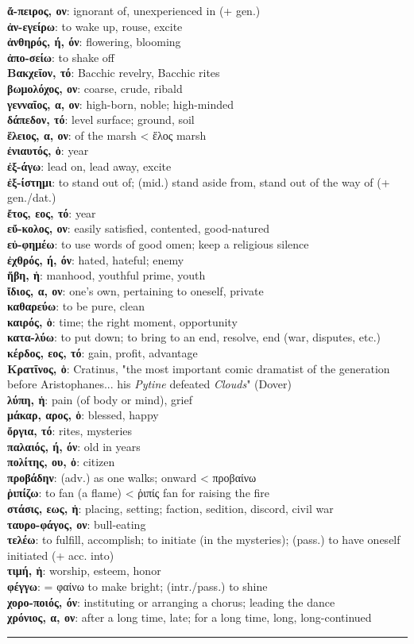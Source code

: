 \documentclass[13pt]{article}
\newcommand{\vocabentry}[2]{\textbf{#1}: #2\vspace{0.0em}\\}
\begin{document}
\begin{greek}
\newpage
\begin{multicols}{2}
\small %
\vocabentry{ἄ-πειρος, ον}{ignorant of, unexperienced in (+ gen.)}
\vocabentry{ἀν-εγείρω}{to wake up, rouse, excite}
\vocabentry{ἀνθηρός, ή, όν}{flowering, blooming}
\vocabentry{ἀπο-σείω}{to shake off}
\vocabentry{Βακχεῖον, τό}{Bacchic revelry, Bacchic rites}
\vocabentry{βωμολόχος, ον}{coarse, crude, ribald}
\vocabentry{γενναῖος, α, ον}{high-born, noble; high-minded}
\vocabentry{δάπεδον, τό}{level surface; ground, soil}
\vocabentry{ἕλειος, α, ον}{of the marsh < ἕλος marsh}
\vocabentry{ἐνιαυτός, ὁ}{year}
\vocabentry{ἐξ-άγω}{lead on, lead away, excite}
\vocabentry{ἐξ-ίστημι}{to stand out of; (mid.) stand aside from, stand out of the way of (+ gen./dat.)}
\vocabentry{ἔτος, εος, τό}{year}
\vocabentry{εὔ-κολος, ον}{easily satisfied, contented, good-natured}
\vocabentry{εὐ-φημέω}{to use words of good omen; keep a religious silence}
\vocabentry{ἐχθρός, ή, όν}{hated, hateful; enemy}
\vocabentry{ἥβη, ἡ}{manhood, youthful prime, youth}
\vocabentry{ἴδιος, α, ον}{one's own, pertaining to oneself, private}
\vocabentry{καθαρεύω}{to be pure, clean}
\vocabentry{καιρός, ὁ}{time; the right moment, opportunity}
\vocabentry{κατα-λύω}{to put down; to bring to an end, resolve, end (war, disputes, etc.)}
\vocabentry{κέρδος, εος, τό}{gain, profit, advantage}
\vocabentry{Κρατῖνος, ὁ}{Cratinus, "the most important comic dramatist of the generation before Aristophanes... his \textit{Pytine} defeated \textit{Clouds}" (Dover)}
\vocabentry{λύπη, ἡ}{pain (of body or mind), grief}
\vocabentry{μάκαρ, αρος, ὁ}{blessed, happy}
\vocabentry{ὄργια, τό}{rites, mysteries}
\vocabentry{παλαιός, ή, όν}{old in years}
\vocabentry{πολίτης, ου, ὁ}{citizen}
\vocabentry{προβάδην}{(adv.) as one walks; onward < προβαίνω}
\vocabentry{ῥιπίζω}{to fan (a flame) < ῥιπίς fan for raising the fire}
\vocabentry{στάσις, εως, ἡ}{placing, setting; faction, sedition, discord, civil war}
\vocabentry{ταυρο-φάγος, ον}{bull-eating}
\vocabentry{τελέω}{to fulfill, accomplish; to initiate (in the mysteries); (pass.) to have oneself initiated (+ acc. into)}
\vocabentry{τιμή, ἡ}{worship, esteem, honor}
\vocabentry{φέγγω}{= φαίνω to make bright; (intr./pass.) to shine}
\vocabentry{χορο-ποιός, όν}{instituting or arranging a chorus; leading the dance}
\vocabentry{χρόνιος, α, ον}{after a long time, late; for a long time, long, long-continued}
\end{multicols}

\vspace{-1.5em}
\noindent\rule{\linewidth}{0.4pt}
\vspace{-2em}


\end{greek}
\end{document}
